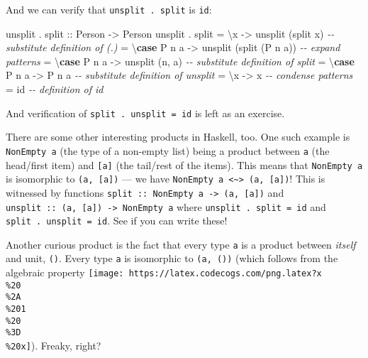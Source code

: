\documentclass[]{article}
\newenvironment{Shaded}{}{}
\newcommand{\CommentTok}[1]{\textcolor[rgb]{0.38,0.63,0.69}{\textit{#1}}}
\newcommand{\DataTypeTok}[1]{\textcolor[rgb]{0.56,0.13,0.00}{#1}}
\newcommand{\FunctionTok}[1]{\textcolor[rgb]{0.02,0.16,0.49}{#1}}
\newcommand{\KeywordTok}[1]{\textcolor[rgb]{0.00,0.44,0.13}{\textbf{#1}}}
\newcommand{\NormalTok}[1]{#1}
\newcommand{\OperatorTok}[1]{\textcolor[rgb]{0.40,0.40,0.40}{#1}}
\newcommand{\OtherTok}[1]{\textcolor[rgb]{0.00,0.44,0.13}{#1}}
\begin{document}
And we can verify that \texttt{unsplit\ .\ split} is \texttt{id}:

\begin{Shaded}
\begin{Highlighting}[]
\NormalTok{unsplit }\OperatorTok{.}\OtherTok{ split ::} \DataTypeTok{Person} \OtherTok{{-}>} \DataTypeTok{Person}
\NormalTok{unsplit }\OperatorTok{.}\NormalTok{ split}
    \OtherTok{=}\NormalTok{ \textbackslash{}x          }\OtherTok{{-}>}\NormalTok{ unsplit (split x)        }\CommentTok{{-}{-} substitute definition of (.)}
    \OtherTok{=}\NormalTok{ \textbackslash{}}\KeywordTok{case} \DataTypeTok{P}\NormalTok{ n a }\OtherTok{{-}>}\NormalTok{ unsplit (split (}\DataTypeTok{P}\NormalTok{ n a))  }\CommentTok{{-}{-} expand patterns}
    \OtherTok{=}\NormalTok{ \textbackslash{}}\KeywordTok{case} \DataTypeTok{P}\NormalTok{ n a }\OtherTok{{-}>}\NormalTok{ unsplit (n, a)           }\CommentTok{{-}{-} substitute definition of split}
    \OtherTok{=}\NormalTok{ \textbackslash{}}\KeywordTok{case} \DataTypeTok{P}\NormalTok{ n a }\OtherTok{{-}>} \DataTypeTok{P}\NormalTok{ n a                    }\CommentTok{{-}{-} substitute definition of unsplit}
    \OtherTok{=}\NormalTok{ \textbackslash{}x      }\OtherTok{{-}>}\NormalTok{ x                            }\CommentTok{{-}{-} condense patterns}
    \OtherTok{=} \FunctionTok{id}                                      \CommentTok{{-}{-} definition of id}
\end{Highlighting}
\end{Shaded}

And verification of \texttt{split\ .\ unsplit\ =\ id} is left as an exercise.

There are some other interesting products in Haskell, too. One such example is
\texttt{NonEmpty\ a} (the type of a non-empty list) being a product between
\texttt{a} (the head/first item) and \texttt{{[}a{]}} (the tail/rest of the
items). This means that \texttt{NonEmpty\ a} is isomorphic to
\texttt{(a,\ {[}a{]})} --- we have
\texttt{NonEmpty\ a\ \textless{}\textasciitilde{}\textgreater{}\ (a,\ {[}a{]})}!
This is witnessed by functions
\texttt{split\ ::\ NonEmpty\ a\ -\textgreater{}\ (a,\ {[}a{]})} and
\texttt{unsplit\ ::\ (a,\ {[}a{]})\ -\textgreater{}\ NonEmpty\ a} where
\texttt{unsplit\ .\ split\ =\ id} and \texttt{split\ .\ unsplit\ =\ id}. See if
you can write these!

Another curious product is the fact that every type \texttt{a} is a product
between \emph{itself} and unit, \texttt{()}. Every type \texttt{a} is isomorphic
to \texttt{(a,\ ())} (which follows from the algebraic property
\texttt{[image: https://latex.codecogs.com/png.latex?x\\\%20\\\%2A\\\%201\\\%20\\\%3D\\\%20x]}).
Freaky, right?
\end{document}
